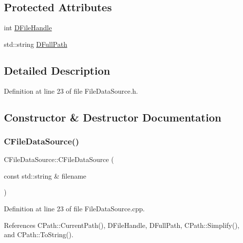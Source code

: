 \subsection*{Protected Attributes}
\begin{DoxyCompactItemize}
\item 
int \hyperlink{classCFileDataSource_abad036de6dfe018ddc6160a2026a401d}{D\+File\+Handle}
\item 
std\+::string \hyperlink{classCFileDataSource_acf4e0d3f7c32cae09f91b7530e490aea}{D\+Full\+Path}
\end{DoxyCompactItemize}


\subsection{Detailed Description}


Definition at line 23 of file File\+Data\+Source.\+h.



\subsection{Constructor \& Destructor Documentation}
\hypertarget{classCFileDataSource_a785000233dad6de4fe5f5986639642b3}{}\label{classCFileDataSource_a785000233dad6de4fe5f5986639642b3} 
\subsubsection{\texorpdfstring{C\+File\+Data\+Source()}{CFileDataSource()}}
{\footnotesize\ttfamily C\+File\+Data\+Source\+::\+C\+File\+Data\+Source (\begin{DoxyParamCaption}\item[{const std\+::string \&}]{filename }\end{DoxyParamCaption})}



Definition at line 23 of file File\+Data\+Source.\+cpp.



References C\+Path\+::\+Current\+Path(), D\+File\+Handle, D\+Full\+Path, C\+Path\+::\+Simplify(), and C\+Path\+::\+To\+String().


